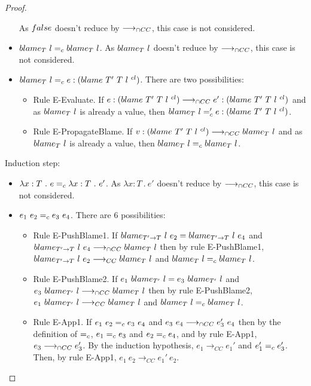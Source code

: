 \documentclass[a4paper]{article}
\begin{document}
\begin{proof}
\begin{itemize}
    As $false$ doesn't reduce by $\longrightarrow_{\cap CC}$, this case is not considered.
    \item $blame_{T}\ l =_c blame_{T}\ l$.
    As $blame_{T}\ l$ doesn't reduce by $\longrightarrow_{\cap CC}$, this case is not considered.
    \item $blame_{T}\ l =_c e : (blame\ T'\ T\ l\ ^{cl})$.
    There are two possibilities:
    \begin{itemize}
        \item Rule E-Evaluate.
        If $e : (blame\ T'\ T\ l\ ^{cl}) \longrightarrow_{\cap CC} e' : (blame\ T'\ T\ l\ ^{cl})$ and as $blame_{T}\ l$ is already a value, then $blame_{T}\ l =_c 'e : (blame\ T'\ T\ l\ ^{cl})$.
        \item Rule E-PropagateBlame.
        If $v : (blame\ T'\ T\ l\ ^{cl}) \longrightarrow_{\cap CC} blame_{T}\ l$ and as $blame_{T}\ l$ is already a value, then $blame_{T}\ l =_c blame_{T}\ l$.
    \end{itemize}
\end{itemize}
Induction step:
\begin{itemize}
    \item $\lambda x : T\ .\ e =_c \lambda x : T\ .\ e'$.
    As $\lambda x : T\ .\ e'$ doesn't reduce by $\longrightarrow_{\cap CC}$, this case is not considered.
    \item $e_1\ e_2 \equalityCasts e_3\ e_4$.
    There are 6 possibilities:
    \begin{itemize}
        \item Rule E-PushBlame1.
        If $blame_{T' \rightarrow T}\ l\ e_2 = blame_{T' \rightarrow T}\ l\ e_4$ and $blame_{T' \rightarrow T}\ l\ e_4 \longrightarrow_{\cap CC} blame_{T}\ l$ then by rule E-PushBlame1, $blame_{T' \rightarrow T}\ l\ e_2 \longrightarrow_{CC} blame_{T}\ l$ and $blame_{T}\ l =_c blame_{T}\ l$.
        \item Rule E-PushBlame2.
        If $e_1\ \blame{T'}{l} = e_3\ \blame{T'}{l}$ and $e_3\ blame_{T'}\ l \longrightarrow_{\cap CC} blame_{T}\ l$ then by rule E-PushBlame2, $e_1\ blame_{T'}\ l \longrightarrow_{CC} blame_{T}\ l$ and $blame_{T}\ l =_c blame_{T}\ l$.
        \item Rule E-App1.
        If $e_1\ e_2 \equalityCasts e_3\ e_4$ and $e_3\ e_4 \longrightarrow_{\cap CC} e_3'\ e_4$ then by the definition of $=_c$, $e_1 =_c e_3$ and $e_2 =_c e_4$, and by rule E-App1, $e_3 \longrightarrow_{\cap CC} e_3'$.
        By the induction hypothesis, $e_1 \longrightarrow_{CC} e_1'$ and $e_1' =_c e_3'$.
        Then, by rule E-App1, $e_1\ e_2 \longrightarrow_{CC} e_1'\ e_2$.

\end{itemize}
\end{itemize}
\end{proof}
\end{document}
